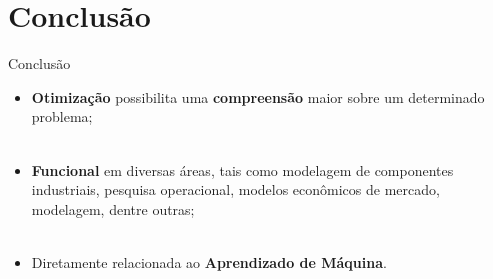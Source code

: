 \section{Conclusão}
\label{s.conclusion}

\begin{frame}{Conclusão}
	\begin{itemize}
		\justifying
		\item \textbf{Otimização} possibilita uma \textbf{compreensão} maior sobre um determinado problema;
		\\~\\
		\item \textbf{Funcional} em diversas áreas, tais como modelagem de componentes industriais, pesquisa operacional, modelos econômicos de mercado, modelagem, dentre outras;
		\\~\\
		\item Diretamente relacionada ao \textbf{Aprendizado de Máquina}.
	\end{itemize}

\end{frame}